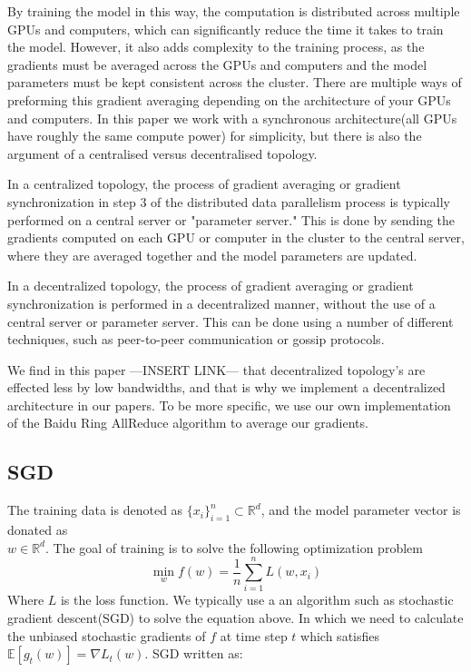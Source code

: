 \documentclass[11pt]{article}
\begin{document}
By training the model in this way, the computation is distributed across multiple GPUs and computers, which can significantly reduce the time it takes to train the model. However, it also adds complexity to the training process, as the gradients must be averaged across the GPUs and computers and the model parameters must be kept consistent across the cluster. There are multiple ways of preforming this gradient averaging depending on the architecture of your GPUs and computers. In this paper we work with a synchronous architecture(all GPUs have roughly the same compute power) for simplicity, but there is also the argument of a centralised versus decentralised topology.

In a centralized topology, the process of gradient averaging or gradient synchronization in step 3 of the distributed data parallelism process is typically performed on a central server or "parameter server." This is done by sending the gradients computed on each GPU or computer in the cluster to the central server, where they are averaged together and the model parameters are updated.

In a decentralized topology, the process of gradient averaging or gradient synchronization is performed in a decentralized manner, without the use of a central server or parameter server. This can be done using a number of different techniques, such as peer-to-peer communication or gossip protocols.

We find in this paper ---INSERT LINK--- that decentralized topology's are effected less by low bandwidths, and that is why we implement a decentralized architecture in our papers. To be more specific, we use our own implementation of the Baidu Ring AllReduce algorithm to average our gradients.

\subsection{SGD}

The training data is denoted as $\{x_i\}^n_{i=1} \subset \mathbb{R}^d$, and the model parameter vector is donated as\\ $w \in \mathbb{R}^d$. The goal of training is to solve the following optimization problem 
$$
\min_w f
(w) = \frac{1}{n} \sum^n_{i=1}L(w,x_i)
$$
Where $L$ is the loss function. We typically use a an algorithm such as stochastic gradient descent(SGD) to solve the equation above. In which we need to calculate the unbiased stochastic gradients of $f$ at time step $t$ which satisfies $\mathbb{E}[g_t(w)] = {\nabla} L_t(w)$. SGD written as:
\end{document}
